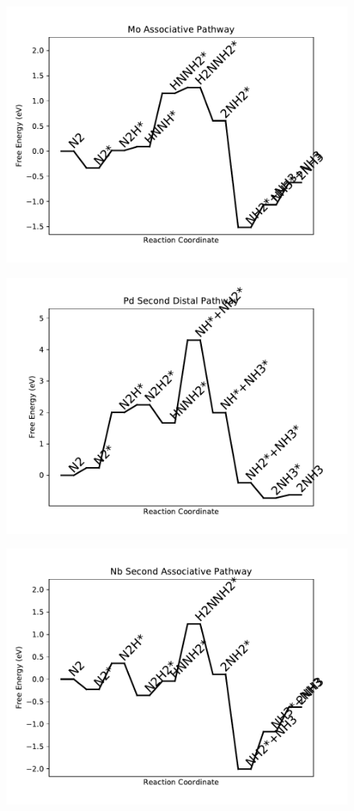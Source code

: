 \begin{figure}
\includegraphics[width=0.8\linewidth]{data/plots/Mo_associative.pdf}
\end{figure}

\begin{figure}
\includegraphics[width=0.8\linewidth]{data/plots/Pd_distal_2.pdf}
\end{figure}

\begin{figure}
\includegraphics[width=0.8\linewidth]{data/plots/Nb_associative_2.pdf}
\end{figure}

